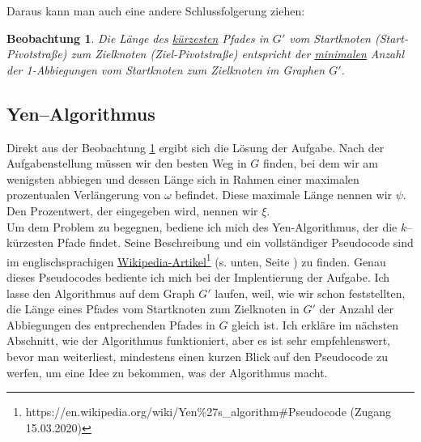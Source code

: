 \documentclass[a4paper,10pt,ngerman]{scrartcl}
\newtheorem{lemma}{Beobachtung}
\begin{document}
Daraus kann man auch eine andere Schlussfolgerung ziehen:
\begin{lemma}
\label{najlepszadroga} Die Länge des \underline{kürzesten} Pfades in $G'$ vom Startknoten (Start-Pivotstraße) 
zum Zielknoten (Ziel-Pivotstraße) 
entspricht der \underline{minimalen} Anzahl der 1-Abbiegungen vom Startknoten zum Zielknoten im Graphen $G'$.
\end{lemma}

\subsection{Yen--Algorithmus}

Direkt aus der Beobachtung \ref{najlepszadroga} ergibt sich die Lösung der Aufgabe.
Nach der Aufgabenstellung müssen wir den besten Weg in $G$ finden, bei dem wir am wenigsten abbiegen
und dessen Länge sich in Rahmen einer maximalen prozentualen Verlängerung von $\omega$ befindet.
Diese maximale Länge nennen wir $\psi$. Den Prozentwert, der eingegeben wird, nennen wir $\xi$.\\
Um dem Problem zu begegnen, bediene ich mich des Yen-Algorithmus, der die $k$–kürzesten Pfade findet.
Seine Beschreibung und ein vollständiger Pseudocode sind im englischsprachigen 
\href{https://en.wikipedia.org/wiki/Yen%27s_algorithm#Pseudocode}{Wikipedia-Artikel}\footnote{https://en.wikipedia.org/wiki/Yen\%27s\_algorithm\#Pseudocode (Zugang 15.03.2020)} (s. unten, Seite \pageref{wikipedia.pseudo}) zu finden.
Genau dieses Pseudocodes bediente ich mich bei der Implentierung der Aufgabe.
Ich lasse den Algorithmus auf dem Graph $G'$ laufen, weil, wie wir schon feststellten, die Länge eines Pfades vom Startknoten zum 
Zielknoten in $G'$ der Anzahl der Abbiegungen des entprechenden Pfades in $G$ gleich ist.
Ich erkläre im nächsten Abschnitt, wie der Algorithmus funktioniert, aber es ist sehr empfehlenswert,
bevor man weiterliest, mindestens einen kurzen Blick auf den Pseudocode zu werfen,
um eine Idee zu bekommen, was der Algorithmus macht.\\
\end{document}
